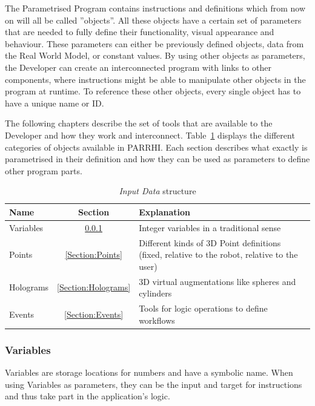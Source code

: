 The Parametrised Program contains instructions and definitions which from now on will all be called ”objects”. All these objects have a certain set of parameters that are needed to fully define their functionality, visual appearance and behaviour. These parameters can either be previously defined objects, data from the Real World Model, or constant values. By using other objects as parameters, the Developer can create an interconnected program with links to other components, where instructions might be able to manipulate other objects in the program at runtime. To reference these other objects, every single object has to have a unique name or ID.

The following chapters describe the set of tools that are available to the Developer and how they work and interconnect. Table~\ref{Table:InputDataStructure} displays the different categories of objects available in PARRHI. Each section describes what exactly is parametrised in their definition and how they can be used as parameters to define other program parts.

\begin{table}[ht]
	\caption{\textit{Input Data} structure}
	\label{Table:InputDataStructure}
	\centering
	\begin{tabular}{lcl}
		\toprule
		Name & Section		& Explanation	\\		
		\midrule
		Variables & \ref{Section:Variables}		& Integer variables in a traditional sense \\
		Points& \ref{Section:Points}		& \parbox[t]{10cm}{Different kinds of 3D Point definitions\\(fixed, relative to the robot, relative to the user)} 	 \\
		Holograms& \ref{Section:Holograms} & 3D virtual augmentations like spheres and cylinders\\
		Events& \ref{Section:Events} & Tools for logic operations to define workflows \\
		\bottomrule
	\end{tabular}
\end{table}

\subsubsection{Variables}\label{Section:Variables}

Variables are storage locations for numbers and have a symbolic name. When using Variables as parameters, they can be the input and target for instructions and thus take part in the application's logic.

